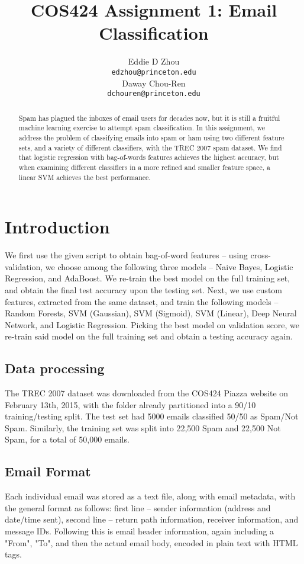 \documentclass{article} %
\title{COS424 Assignment 1: Email Classification}
\author{
Eddie D Zhou\\
\texttt{edzhou@princeton.edu} \\
\And
Daway Chou-Ren\\
\texttt{dchouren@princeton.edu} \\
}
\begin{document}
\maketitle

\begin{abstract}
Spam has plagued the inboxes of email users for decades now, but it is still a fruitful machine learning exercise to attempt spam classification.  In this assignment, we address the problem of classifying emails into spam or ham using two different feature sets, and a variety of different classifiers, with the TREC 2007 spam dataset.  We find that logistic regression with bag-of-words features achieves the highest accuracy, but when examining different classifiers in a more refined and smaller feature space, a linear SVM achieves the best performance.
\end{abstract}
\section{Introduction}
We first use the given script to obtain bag-of-word features -- using cross-validation, we choose among the following three models -- Naive Bayes, Logistic Regression, and AdaBoost.  We re-train the best model on the full training set, and obtain the final test accuracy upon the testing set.  Next, we use custom features, extracted from the same dataset, and train the following models -- Random Forests, SVM (Gaussian), SVM (Sigmoid), SVM (Linear), Deep Neural Network, and Logistic Regression.  Picking the best model on validation score, we re-train said model on the full training set and obtain a testing accuracy again.
\subsection{Data processing}
The TREC 2007 dataset was downloaded from the COS424 Piazza website on February 13th, 2015, with the folder already partitioned into a 90/10 training/testing split. The test set had 5000 emails classified 50/50 as Spam/Not Spam. Similarly, the training set was split into 22,500 Spam and 22,500 Not Spam, for a total of 50,000 emails. 
\subsection*{Email Format}
Each individual email was stored as a text file, along with email metadata, with the general format as follows: first line -- sender information (address and date/time sent), second line -- return path information, receiver information, and message IDs.  Following this is email header information, again including a "From", "To", and then the actual email body, encoded in plain text with HTML tags.
\end{document}
